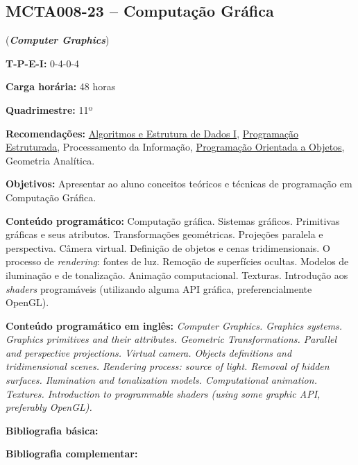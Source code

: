 \documentclass[class=article, crop=false]{standalone}
\begin{document}
\subsection*{MCTA008-23 -- Computação Gráfica}
\label{disc:cg}

(\textbf{\textit{Computer Graphics}})

\begin{center}
    \begin{minipage}{0.85\textwidth}
        \textbf{T-P-E-I:} 0-4-0-4
        
        \textbf{Carga horária:} 48 horas
        
        \textbf{Quadrimestre:} 11º
        
        \textbf{Recomendações:}
        \hyperref[disc:aedI]{Algoritmos e Estrutura de Dados I},
        \hyperref[disc:pe]{Programação Estruturada},
        Processamento da Informação, 
        \hyperref[disc:poo]{Programação Orientada a Objetos},
        Geometria Analítica.
    \end{minipage}
\end{center}

\textbf{Objetivos:}
Apresentar ao aluno conceitos teóricos e técnicas de programação em Computação
Gráfica.

\textbf{Conteúdo programático:}
Computação gráfica.
Sistemas gráficos.
Primitivas gráficas e seus atributos.
Transformações geométricas.
Projeções paralela e perspectiva.
Câmera virtual.
Definição de objetos e cenas tridimensionais.
O processo de \textit{rendering}: fontes de luz.
Remoção de superfícies ocultas.
Modelos de iluminação e de tonalização.
Animação computacional.
Texturas.
Introdução aos \textit{shaders} programáveis (utilizando alguma API gráfica, preferencialmente OpenGL).

\textbf{Conteúdo programático em inglês:}
\textit{Computer Graphics.
Graphics systems.
Graphics primitives and their attributes.
Geometric Transformations.
Parallel and perspective projections.
Virtual camera.
Objects definitions and tridimensional scenes.
Rendering process: source of light.
Removal of hidden surfaces.
Ilumination and tonalization models.
Computational animation.
Textures.
Introduction to programmable shaders (using some graphic API, preferably OpenGL).}

\newrefsection
\textbf{Bibliografia básica:}
\nocite{2008-gomes-etal,2003-azevedo-etal,2020-vries}
\printbibliography

\newrefsection
\textbf{Bibliografia complementar:}
\nocite{2003-edward,2004-edward,2009-bailey-etal,2005-shreiner-etal,2016-kessenich-etal}
\printbibliography
\end{document}
